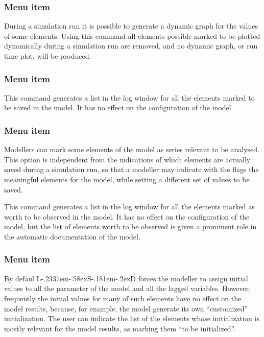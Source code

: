 \documentclass [11pt,a4paper] {book}
\def\LsD{{L\kern-.2337em\lower-.58ex\hbox{S}\kern-.181em\lower-.2ex\hbox{D}}\xspace}
\begin{document}
\subsubsection{Menu item  }

During a simulation run it is possible to generate a dynamic graph for the values of some elements. Using this command all elements possible marked to be plotted dynamically during a simulation run are removed, and no dynamic graph, or run time plot, will be produced.

\subsubsection{Menu item  }

This command generates a list in the log window for all the elements marked to be saved in the model. It has no effect on the configuration of the model.

\subsubsection{Menu item  }

Modellers can mark some elements of the model as series relevant to be analysed. This option is independent from the indications of which elements are actually saved during a simulation run, so that a modeller may indicate with the  flags the meaningful elements for the model, while setting a different set of values to be saved.

This command generates a list in the log window for all the elements marked as worth to be observed in the model. It has no effect on the configuration of the model, but the list of elements worth to be observed is given a prominent role in the automatic documentation of the model.

\subsubsection{Menu item  }

By defaul \LsD forces the modeller to assign initial values to all the parameter of the model and all the lagged variables. However, frequently the initial values for many of such elements have no effect on the model results, because, for example, the model generate its own ``customized'' initialization. The user can indicate the list of the elements whose initialization is mostly relevant for the model results, as marking them ``to be initialized''.
\end{document}
